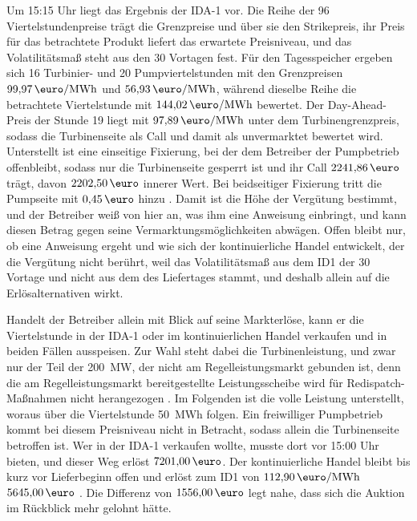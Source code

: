Um 15:15 Uhr liegt das Ergebnis der \ac{IDA-1} vor. Die Reihe der 96 Viertelstundenpreise trägt die Grenzpreise und über sie den Strikepreis, ihr Preis für das betrachtete Produkt liefert das erwartete Preisniveau, und das Volatilitätsmaß steht aus den 30 Vortagen fest. Für den Tagesspeicher ergeben sich 16 Turbinier- und 20 Pumpviertelstunden mit den Grenzpreisen $99{,}97\,\si{\text{\euro}\per MWh}$ und $56{,}93\,\si{\text{\euro}\per MWh}$, während dieselbe Reihe die betrachtete Viertelstunde mit $144{,}02\,\si{\text{\euro}\per MWh}$ bewertet. Der Day-Ahead-Preis der Stunde 19 liegt mit $97{,}89\,\si{\text{\euro}\per MWh}$ unter dem Turbinengrenzpreis, sodass die Turbinenseite als Call und damit als unvermarktet bewertet wird. Unterstellt ist eine einseitige Fixierung, bei der dem Betreiber der Pumpbetrieb offenbleibt, sodass nur die Turbinenseite gesperrt ist und ihr Call $2241{,}86\,\text{\euro}$ trägt, davon $2202{,}50\,\text{\euro}$ innerer Wert. Bei beidseitiger Fixierung tritt die Pumpseite mit $0{,}45\,\text{\euro}$ hinzu \cite{bundesnetzagentur_anlage1_2024}. Damit ist die Höhe der Vergütung bestimmt, und der Betreiber weiß von hier an, was ihm eine Anweisung einbringt, und kann diesen Betrag gegen seine Vermarktungsmöglichkeiten abwägen. Offen bleibt nur, ob eine Anweisung ergeht und wie sich der kontinuierliche Handel entwickelt, der die Vergütung nicht berührt, weil das Volatilitätsmaß aus dem \ac{ID1} der 30 Vortage und nicht aus dem des Liefertages stammt, und deshalb allein auf die Erlösalternativen wirkt.

Handelt der Betreiber allein mit Blick auf seine Markterlöse, kann er die Viertelstunde in der \ac{IDA-1} oder im kontinuierlichen Handel verkaufen und in beiden Fällen ausspeisen. Zur Wahl steht dabei die Turbinenleistung, und zwar nur der Teil der \SI{200}{\mega\watt}, der nicht am Regelleistungsmarkt gebunden ist, denn die am Regelleistungsmarkt bereitgestellte Leistungsscheibe wird für Redispatch-Maßnahmen nicht herangezogen \cite{bundesnetzagentur_anlage1_2024}. Im Folgenden ist die volle Leistung unterstellt, woraus über die Viertelstunde \SI{50}{MWh} folgen. Ein freiwilliger Pumpbetrieb kommt bei diesem Preisniveau nicht in Betracht, sodass allein die Turbinenseite betroffen ist. Wer in der \ac{IDA-1} verkaufen wollte, musste dort vor 15:00 Uhr bieten, und dieser Weg erlöst $7201{,}00\,\text{\euro}$. Der kontinuierliche Handel bleibt bis kurz vor Lieferbeginn offen und erlöst zum \ac{ID1} von $112{,}90\,\si{\text{\euro}\per MWh}$ $5645{,}00\,\text{\euro}$ \cite{smard_marktdaten_2026}. Die Differenz von $1556{,}00\,\text{\euro}$ legt nahe, dass sich die Auktion im Rückblick mehr gelohnt hätte.

